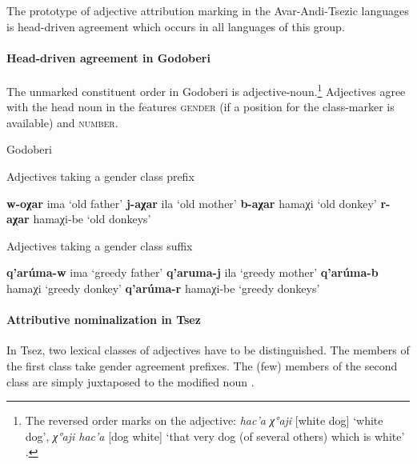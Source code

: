 The prototype of adjective attribution marking in the Avar-Andi-Tsezic languages is head\hyp{}driven agreement which occurs in all languages of this group.

\paragraph*{Head\hyp{}driven agreement in Godoberi}
The unmarked constituent order in Godoberi is adjective-noun.\footnote{The reversed order marks  on the adjective: \textit{hac'a χ°aji} [white dog] ‘white dog’, \textit{χ°aji hac'a} [dog white] ‘that very dog (of several others) which is white’ \citep[149]{kazenin1996a}.} Adjectives agree with the head noun in the features \textsc{gender} (if a position for the class-marker is available) and \textsc{number}.
\begin{exe}
\ex
\settowidth\jamwidth{[\textsc{n.pl}]}
\rm{Godoberi \citep[25]{tatevosov1996a}}
\begin{xlist}
\ex 
\rm{Adjectives taking a gender class prefix}
\begin{xlist}
\ex \textbf{w-oχar} ima 			\rm{‘old father’}			\jambox{\rm{[\textsc{m}]}}
\ex \textbf{j-aχar} ila				\rm{‘old mother’}		\jambox{\rm{[\textsc{f}]}}
\ex \textbf{b-aχar} hamaχi			\rm{‘old donkey’}		\jambox{\rm{[\textsc{n}]}}
\ex \textbf{r-aχar} hamaχi-be 		\rm{‘old donkeys’}		\jambox{\rm{[\textsc{n.pl}]}}
\end{xlist}

\ex 
\rm{Adjectives taking a gender class suffix}
\begin{xlist}
\ex \textbf{q'arúma-w} ima			\rm{‘greedy father’}		\jambox{\rm{[\textsc{m}]}}
\ex \textbf{q'aruma-j} ila			\rm{‘greedy mother’}		\jambox{\rm{[\textsc{f}]}}
\ex \textbf{q'arúma-b} hamaχi 		\rm{‘greedy donkey’}		\jambox{\rm{[\textsc{n}]}}
\ex \textbf{q'arúma-r} hamaχi-be	\rm{‘greedy donkeys’}	\jambox{\rm{[\textsc{n.pl}]}}
\end{xlist}
\end{xlist}
\end{exe}

\paragraph*{Attributive nominalization in Tsez}
In Tsez, two lexical classes of adjectives have to be distinguished. The members of the first class take gender agreement prefixes. The (few) members of the second class are simply juxtaposed to the modified noun \cite[126]{alekseev-etal2004}.

